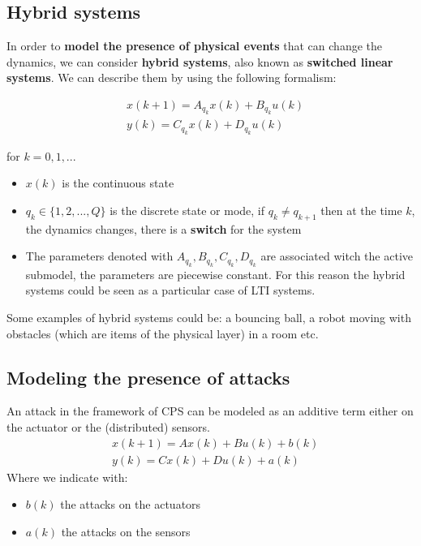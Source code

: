 \subsection*{Hybrid systems}
In order to \textbf{model the presence of physical events} that can change the dynamics, we can consider \textbf{hybrid systems}, also known as  \textbf{switched linear systems}. We can describe them by using the following formalism:
\vspace{1cm}
\begin{large}
    \begin{align*}
    &x(k+1)=A_{q_k}x(k)+B_{q_k}u(k)\\
    &y(k)= C_{q_k}x(k)+D_{q_k}u(k) 
\end{align*}
\end{large}

\vspace{3cm}
for $k=0,1,...$
\begin{itemize}
    \setlength\itemsep{0em}
    \item $x(k)$ is the continuous state
    \item $q_k \in \{1, 2, ..., Q\}$ is the discrete state or {\color{red} mode}, if $q_k \neq q_{k+1}$ then at the time $k$, the dynamics changes, there is a \textbf{switch} for the system
    \item The parameters denoted with \textbf{$A_{q_k}, B_{q_k}, C_{q_k}, D_{q_k} $} are associated witch the {\color{red} active submodel}, the parameters are {\color{blue} piecewise constant}. For this reason the hybrid systems could be seen as a particular case of LTI systems.
\end{itemize}
\noindent
Some examples of hybrid systems could be: a bouncing ball,  a robot moving with obstacles (which are items of the physical layer) in a room etc.

\subsection*{Modeling the presence of attacks}
An attack in the framework of CPS can be modeled as an additive term either on the actuator or the (distributed) sensors.
\begin{align*}
    &x(k+1)=Ax(k)+Bu(k)+b(k)\\
    &y(k)=Cx(k)+Du(k)+a(k)
\end{align*}
Where we indicate with: 
\begin{itemize}
    \setlength\itemsep{0em}
    \item $b(k)$ the attacks on the actuators
    \item $a(k)$ the attacks on the sensors
\end{itemize}

